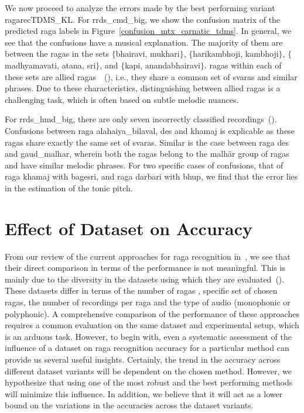 We now proceed to analyze the errors made by the best performing variant \acrshort{ragarecTDMS_KL}. For \acrshort{rrds_cmd_big}, we show the confusion matrix of the predicted \gls{raga} labels in Figure~\ref{confusion_mtx_carnatic_tdms}. In general, we see that the confusions have a musical explanation. The majority of them are between the \glspl{raga} in the sets $\lbrace$\gls{bhairavi}, \gls{mukhari}$\rbrace$, $\lbrace$\gls{harikambhoji}, \gls{kambhoji}$\rbrace$, $\lbrace$\gls{madhyamavati}, \gls{atana}, \gls{sri}$\rbrace$, and $\lbrace$\gls{kapi}, \gls{anandabhairavi}$\rbrace$. \Glspl{raga} within each of these sets are allied \glspl{raga}~\citep{Viswanathan2004}~(), i.e., they share a common set of \glspl{svara} and similar phrases. Due to these characteristics, distinguishing between allied \glspl{raga} is a challenging task, which is often based on subtle melodic nuances.

For \acrshort{rrds_hmd_big}, there are only seven incorrectly classified recordings~(). Confusions between \Gls{raga} \gls{alahaiya_bilaval},  \gls{des} and \gls{khamaj} is explicable as these \glspl{raga} share exactly the same set of \glspl{svara}.  Similar is the case between \gls{raga} \gls{des} and \gls{gaud_malhar}, wherein both the \glspl{raga} belong to the malh\={a}r group of \glspl{raga} and have similar melodic phrases. For two specific cases of confusions, that of \gls{raga} \gls{khamaj} with \gls{bagesri}, and \gls{raga} \gls{darbari} with \gls{bhup}, we find that the error lies in the estimation of the tonic pitch.



\section{Effect of Dataset on Accuracy}
\label{sec:ragarec_dataset_effect}

From our review of the current approaches for \gls{raga} recognition in~, we see that their direct comparison in terms of the performance is not meaningful. This is mainly due to the diversity in the datasets using which they are evaluated~(). These datasets differ in terms of the number of \glspl{raga} , specific set of chosen \glspl{raga}, the number of recordings per \gls{raga} and the type of audio (monophonic or polyphonic). A comprehensive comparison of the performance of these approaches requires a common evaluation on the same dataset and experimental setup, which is an arduous task. However, to begin with, even a systematic assessment of the influence of a dataset on \gls{raga} recognition accuracy for a particular method can provide us several useful insights. Certainly, the trend in the accuracy across different dataset variants will be dependent on the chosen method. However, we hypothesize that using one of the most robust and the best performing methods will minimize this influence. In addition, we believe that it will act as a lower bound on the variations in the accuracies across the dataset variants. 

